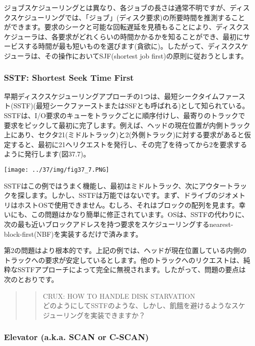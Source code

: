 ジョブスケジューリングとは異なり、各ジョブの長さは通常不明ですが、ディスクスケジューリングでは、「ジョブ」(ディスク要求)の所要時間を推測することができます。要求のシークと可能な回転遅延を見積もることにより、ディスクスケジューラは、各要求がどれくらいの時間かかるかを知ることができ、最初にサービスする時間が最も短いものを選びます(貪欲に)。したがって、ディスクスケジューラは、その操作においてSJF(shortest
job first)の原則に従おうとします。

\hypertarget{sstf-shortest-seek-time-first}{%
\subsubsection*{SSTF: Shortest Seek Time
First}\label{sstf-shortest-seek-time-first}}

早期ディスクスケジューリングアプローチの1つは、最短シークタイムファースト(SSTF)(最短シークファーストまたはSSFとも呼ばれる)として知られている。SSTFは、I/O要求のキューをトラックごとに順序付けし、最寄りのトラックで要求をピックして最初に完了します。例えば、ヘッドの現在位置が内側トラック上にあり、セクタ21(ミドルトラック)と2(外側トラック)に対する要求があると仮定すると、最初に21へリクエストを発行し、その完了を待ってから2を要求するように発行します(図37.7)。

\texttt{[image: ../37/img/fig37\_7.PNG]}

SSTFはこの例ではうまく機能し、最初はミドルトラック、次にアウタートラックを探します。しかし、SSTFは万能ではないです。まず、ドライブのジオメトリはホストOSで使用できません。むしろ、それはブロックの配列を見ます。幸いにも、この問題はかなり簡単に修正されています。OSは、SSTFの代わりに、次の最も近いブロックアドレスを持つ要求をスケジューリングするnearest-block-first(NBF)を実装するだけで済みます。

第2の問題はより根本的です。上記の例では、ヘッドが現在位置している内側のトラックへの要求が安定しているとします。他のトラックへのリクエストは、純粋なSSTFアプローチによって完全に無視されます。したがって、問題の要点は次のとおりです。

\begin{quote}
\begin{quote}
CRUX: HOW TO HANDLE DISK STARVATION\\
どのようにしてSSTFのような、しかし、飢餓を避けるようなスケジューリングを実装できますか？
\end{quote}
\end{quote}

\hypertarget{elevator-a.k.a.-scan-or-c-scan}{%
\subsubsection*{Elevator (a.k.a. SCAN or
C-SCAN)}\label{elevator-a.k.a.-scan-or-c-scan}}


